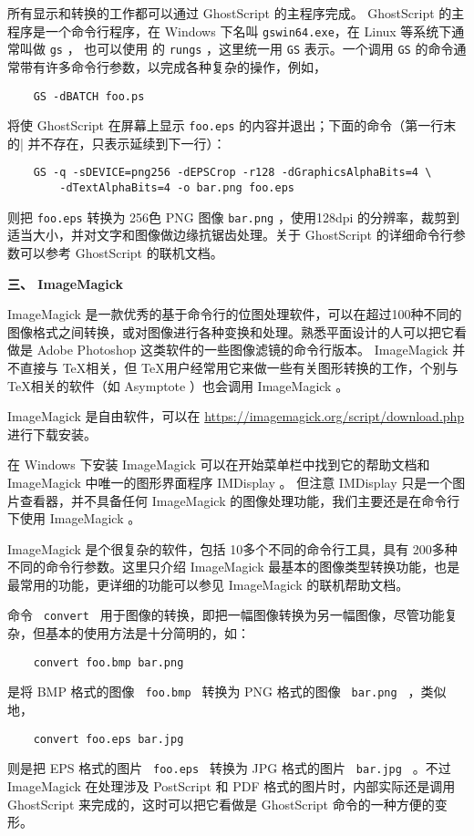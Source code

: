 所有显示和转换的工作都可以通过 GhostScript 的主程序完成。 GhostScript 的主程序是一个命令行程序，在 Windows 下名叫 \verb|gswin64.exe|，在 Linux 等系统下通常叫做 \verb|gs| ， 也可以使用 \texlive 的 \verb|rungs| ，这里统一用 \verb|GS| 表示。一个调用 \verb|GS| 的命令通常带有许多命令行参数，以完成各种复杂的操作，例如，
\begin{lstlisting}
    GS -dBATCH foo.ps
\end{lstlisting}
将使 GhostScript 在屏幕上显示 \verb|foo.eps| 的内容并退出；下面的命令（第一行末的\verb||| 并不存在，只表示延续到下一行）：
\begin{lstlisting}
    GS -q -sDEVICE=png256 -dEPSCrop -r128 -dGraphicsAlphaBits=4 \
        -dTextAlphaBits=4 -o bar.png foo.eps
\end{lstlisting}
则把 \verb|foo.eps| 转换为 256色 PNG 图像 \verb|bar.png| ，使用128dpi 的分辨率，裁剪到适当大小，并对文字和图像做边缘抗锯齿处理。关于 GhostScript 的详细命令行参数可以参考 GhostScript 的联机文档。

\textbf{三、 ImageMagick}

ImageMagick 是一款优秀的基于命令行的位图处理软件，可以在超过100种不同的图像格式之间转换，或对图像进行各种变换和处理。熟悉平面设计的人可以把它看做是 Adobe Photoshop 这类软件的一些图像滤镜的命令行版本。 ImageMagick 并不直接与 \TeX 相关，但 \TeX 用户经常用它来做一些有关图形转换的工作，个别与 \TeX 相关的软件（如 Asymptote ）也会调用 ImageMagick 。

ImageMagick 是自由软件，可以在 \href{https://imagemagick.org/script/download.php}{https://imagemagick.org/script/download.php}进行下载安装。

在 Windows 下安装 ImageMagick 可以在开始菜单栏中找到它的帮助文档和 ImageMagick 中唯一的图形界面程序 IMDisplay 。 但注意 IMDisplay 只是一个图片查看器，并不具备任何 ImageMagick 的图像处理功能，我们主要还是在命令行下使用 ImageMagick 。

ImageMagick 是个很复杂的软件，包括 10多个不同的命令行工具，具有 200多种不同的命令行参数。这里只介绍 ImageMagick 最基本的图像类型转换功能，也是最常用的功能，更详细的功能可以参见 ImageMagick 的联机帮助文档。

命令 \verb| convert | 用于图像的转换，即把一幅图像转换为另一幅图像，尽管功能复杂，但基本的使用方法是十分简明的，如：
\begin{lstlisting}
    convert foo.bmp bar.png
\end{lstlisting}
是将 BMP 格式的图像  \verb| foo.bmp | 转换为 PNG 格式的图像 \verb| bar.png | ，类似地，
\begin{lstlisting}
    convert foo.eps bar.jpg
\end{lstlisting}
则是把 EPS 格式的图片 \verb| foo.eps | 转换为 JPG 格式的图片 \verb| bar.jpg |  。不过 ImageMagick 在处理涉及 PostScript 和 PDF 格式的图片时，内部实际还是调用 GhostScript 来完成的，这时可以把它看做是 GhostScript 命令的一种方便的变形。

